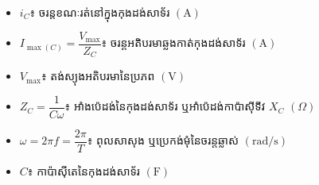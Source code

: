 \vspace{0.2em}
\noindent
\begin{minipage}[t]{0.48\textwidth}
	\begin{itemize}[itemsep=2pt, topsep=1pt, parsep=0pt, leftmargin=1.5em]
		\item $i_C$៖ ចរន្តខណៈរត់នៅក្នុងកុងដង់សាទ័រ $(\mathrm{A})$
		\item $I_{\max(C)} = \dfrac{V_{\max}}{Z_C}$៖ ចរន្តអតិបរមាឆ្លងកាត់កុងដង់សាទ័រ $(\mathrm{A})$
		\item $V_{\max}$៖ តង់ស្យុងអតិបរមានៃប្រភព $(\mathrm{V})$
	\end{itemize}
\end{minipage}%
\hfill
\begin{minipage}[t]{0.48\textwidth}
	\begin{itemize}[itemsep=2pt, topsep=1pt, parsep=0pt, leftmargin=1.5em]
		\item $Z_C = \dfrac{1}{C\omega}$៖ អាំងប៉េដង់នៃកុងដង់សាទ័រ ឬអាំប៉េដង់កាប៉ាស៊ីទីវ $X_C$ $(\Omega)$
		\item $\omega = 2\pi f = \dfrac{2\pi}{T}$៖ ពុលសាសុង ឬប្រេកង់មុំនៃចរន្តឆ្លាស់ $(\mathrm{rad/s})$
		\item $C$៖ កាប៉ាស៊ីតេនៃកុងដង់សាទ័រ $(\mathrm{F})$
	\end{itemize}
\end{minipage}

\vspace{0.4em}

